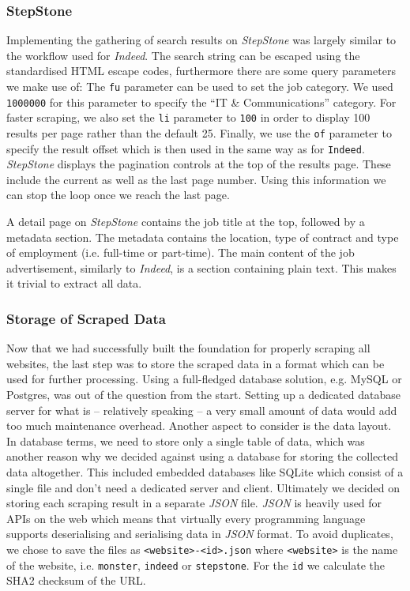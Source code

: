 \documentclass[runningheads]{llncs}
\begin{document}
\subsubsection{StepStone}
\label{subsub:stepstone}

Implementing the gathering of search results on \textit{StepStone} \cite{stepstone} was largely similar to the workflow used for \textit{Indeed}. The search string can be escaped using the standardised HTML escape codes, furthermore there are some query parameters we make use of: The \texttt{fu} parameter can be used to set the job category. We used \texttt{1000000} for this parameter to specify the “IT \& Communications” category. For faster scraping, we also set the \texttt{li} parameter to \texttt{100} in order to display 100 results per page rather than the default 25. Finally, we use the \texttt{of} parameter to specify the result offset which is then used in the same way as for \texttt{Indeed}. \textit{StepStone} displays the pagination controls at the top of the results page. These include the current as well as the last page number. Using this information we can stop the loop once we reach the last page.

A detail page on \textit{StepStone} contains the job title at the top, followed by a metadata section. The metadata contains the location, type of contract and type of employment (i.e. full-time or part-time). The main content of the job advertisement, similarly to \textit{Indeed}, is a section containing plain text. This makes it trivial to extract all data.

\subsubsection{Storage of Scraped Data}
\label{subsub:storage_of_scraped_data}

Now that we had successfully built the foundation for properly scraping all websites, the last step was to store the scraped data in a format which can be used for further processing. Using a full-fledged database solution, e.g. MySQL or Postgres, was out of the question from the start. Setting up a dedicated database server for what is -- relatively speaking -- a very small amount of data would add too much maintenance overhead. Another aspect to consider is the data layout.
In database terms, we need to store only a single table of data, which was another reason why we decided against using a database for storing the collected data altogether. This included embedded databases like SQLite which consist of a single file and don't need a dedicated server and client. Ultimately we decided on storing each scraping result in a separate \textit{JSON} file. \textit{JSON} is heavily used for APIs on the web which means that virtually every programming language supports deserialising and serialising data in \textit{JSON} format. To avoid duplicates, we chose to save the files as \texttt{<website>-<id>.json} where \texttt{<website>} is the name of the website, i.e. \texttt{monster}, \texttt{indeed} or \texttt{stepstone}. For the \texttt{id} we calculate the SHA2 checksum of the URL.
\end{document}
